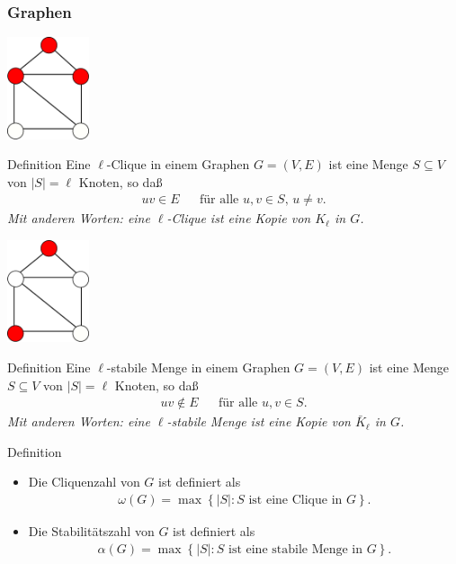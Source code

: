 \documentclass[aspectratio=1610, 11pt]{beamer}
\newcommand\cbc[1]{\left\{{#1}\right\}}
\newcommand{\mytitle}{Graphen}
\begin{document}
\begin{frame}\frametitle{\mytitle}
	\begin{overprint}
		\hfill\includegraphics[height=30mm]{images/house_clique.pdf}
	\begin{block}{Definition}
		Eine \alert{$\ell$-Clique} in einem Graphen $G=(V,E)$ ist eine Menge $S\subseteq V$ von $|S|=\ell$ Knoten, so da\ss
		\begin{align*}
			uv\in E&&\mbox{f\"ur alle }u,v\in S,\,u\neq v.
		\end{align*}
		\itshape Mit anderen Worten: eine $\ell$-Clique ist eine Kopie von $K_\ell$ in $G$.
	\end{block}
		\hfill\includegraphics[height=30mm]{images/house_ind.pdf}
	\begin{block}{Definition}
		Eine \alert{$\ell$-stabile Menge} in einem Graphen $G=(V,E)$ ist eine Menge $S\subseteq V$ von $|S|=\ell$  Knoten, so da\ss
		\begin{align*}
			uv\not\in E&&\mbox{f\"ur alle }u,v\in S.
		\end{align*}
		\itshape Mit anderen Worten: eine $\ell$-stabile Menge ist eine Kopie von $\bar K_\ell$ in $G$.
	\end{block}
	\begin{block}{Definition}
		\begin{itemize}
			\item Die \alert{Cliquenzahl} von $G$ ist definiert als
				\begin{align*}
					\omega(G)=\max\cbc{|S|:S\mbox{ ist eine Clique in }G}.
				\end{align*}
			\item Die \alert{Stabilit\"atszahl} von $G$ ist definiert als
				\begin{align*}
					\alpha(G)=\max\cbc{|S|:S\mbox{ ist eine stabile Menge in }G}.
				\end{align*}
		\end{itemize}
	\end{block}
	\end{overprint}
\end{frame}
\end{document}

